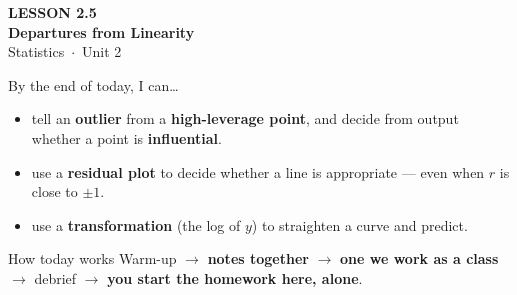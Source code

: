 \documentclass[aspectratio=169, 11pt]{beamer}
\begin{document}
{
\begin{frame}[plain]
  \vspace{2.8cm}\hspace{0.55cm}%
  \begin{minipage}{0.9\textwidth}
    {\color{goldacc}\bfseries\small LESSON 2.5}\\[0.5cm]
    {\color{white}\bfseries\LARGE Departures from Linearity}\\[1.2cm]
    {\color{skymid}\small Statistics~$\cdot$~Unit 2}
  \end{minipage}
\end{frame}
}

\newcommand{\redink}[1]{{\color{redacc}\bfseries #1}}

\begin{frame}[t, plain]
  By the end of today, I can\ldots
  \begin{itemize}\setlength{\itemsep}{5pt}
    \item tell an \textbf{outlier} from a \textbf{high-leverage point}, and decide from output
          whether a point is \textbf{influential}.
    \item use a \textbf{residual plot} to decide whether a line is appropriate --- even when
          $r$ is close to $\pm 1$.
    \item use a \textbf{transformation} (the log of $y$) to straighten a curve and predict.
  \end{itemize}
  \begin{block}{How today works}
    Warm-up $\to$ \textbf{notes together} $\to$ \textbf{one we work as a class} $\to$
    debrief $\to$ \textbf{you start the homework here, alone}.
  \end{block}
\end{frame}
\end{document}

